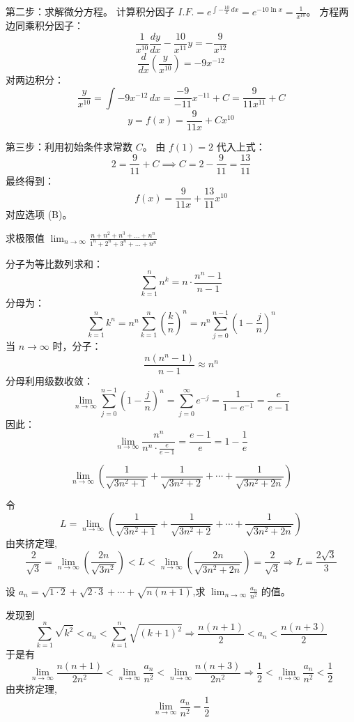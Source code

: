 \begin{questions}
\begin{solution}
第二步：求解微分方程。
计算积分因子 $I.F. = e^{\int -\frac{10}{x} \,dx} = e^{-10 \ln x} = \frac{1}{x^{10}}$。
方程两边同乘积分因子：
\[
\frac{1}{x^{10}} \frac{dy}{dx} - \frac{10}{x^{11}} y = -\frac{9}{x^{12}}
\]
\[
\frac{d}{dx} \left( \frac{y}{x^{10}} \right) = -9x^{-12}
\]
对两边积分：
\[
\frac{y}{x^{10}} = \int -9x^{-12} \,dx = \frac{-9}{-11} x^{-11} + C = \frac{9}{11x^{11}} + C
\]
\[
y = f(x) = \frac{9}{11x} + C x^{10}
\]

第三步：利用初始条件求常数 $C$。
由 $f(1) = 2$ 代入上式：
\[
2 = \frac{9}{11} + C \implies C = 2 - \frac{9}{11} = \frac{13}{11}
\]
最终得到：
\[
f(x) = \frac{9}{11x} + \frac{13}{11} x^{10}
\]
对应选项 (B)。
\end{solution}

\question
求极限值 \(\lim_{n \to \infty} \frac{n + n^2 + n^3 + \dots + n^n}{1^n + 2^n + 3^n + \dots + n^n}\)
\begin{solution}
分子为等比数列求和：
\[ \sum_{k=1}^n n^k = n \cdot \frac{n^n - 1}{n - 1} \]
分母为：
\[ \sum_{k=1}^n k^n = n^n \sum_{k=1}^n \left( \frac{k}{n} \right)^n = n^n \sum_{j=0}^{n-1} \left( 1 - \frac{j}{n} \right)^n \]
当 \(n \to \infty\) 时，分子：
\[ \frac{n(n^n - 1)}{n - 1} \approx n^n \]
分母利用级数收敛：
\[ \lim_{n \to \infty} \sum_{j=0}^{n-1} \left( 1 - \frac{j}{n} \right)^n = \sum_{j=0}^{\infty} e^{-j} = \frac{1}{1 - e^{-1}} = \frac{e}{e - 1} \]
因此：
\[ \lim_{n \to \infty} \frac{n^n}{n^n \cdot \frac{e}{e - 1}} = \frac{e - 1}{e} = 1 - \frac{1}{e} \]
\end{solution}

    \question
    \[
    \lim_{n\to\infty}\left(\frac{1}{\sqrt{3n^{2}+1}}+\frac{1}{\sqrt{3n^{2}+2}}+\cdots+\frac{1}{\sqrt{3n^{2}+2n}}\right)
    \]
    \begin{solution}
        令\[
        L=\lim_{n\to\infty}\left(\frac{1}{\sqrt{3n^{2}+1}}+\frac{1}{\sqrt{3n^{2}+2}}+\cdots+\frac{1}{\sqrt{3n^{2}+2n}}\right)
        \]
        由夹挤定理,
        \[
        \frac{2}{\sqrt 3}=\lim_{n\to \infty} \left(\frac{2n}{\sqrt{3n^2}}    \right) < L < \lim_{n\to \infty} \left(\frac{2n}{\sqrt{3n^2+2n}} \right)=\frac{2}{\sqrt 3}
        \Rightarrow L = \frac{2\sqrt 3}{3}
        \]
    \end{solution}

    \question 设 $a_n = \sqrt{1 \cdot 2} + \sqrt{2 \cdot 3} + \cdots + \sqrt{n(n+1)}$,求 $\displaystyle \lim_{n \to \infty} \frac{a_n}{n^2}$ 的值。
    \begin{solution}
        发现到
        \[
        \sum_{k=1}^n \sqrt{k^2} < a_n < \sum_{k=1}^n \sqrt{(k+1)^2} \Rightarrow \frac{n(n+1)}{2} < a_n < \frac{n(n+3)}{2} 
        \] 
        于是有
        \[
        \lim_{n \to \infty} \frac{n(n+1)}{2n^2} < \lim_{n \to \infty} \frac{a_n}{n^2} < \lim_{n \to \infty} \frac{n(n+3)}{2n^2} \Rightarrow \frac{1}{2} < \lim_{n \to \infty} \frac{a_n}{n^2} < \frac{1}{2} 
        \] 
        由夹挤定理,
        \[
        \lim_{n \to \infty} \frac{a_n}{n^2} = \frac{1}{2}
        \]
    \end{solution}


\end{questions}
